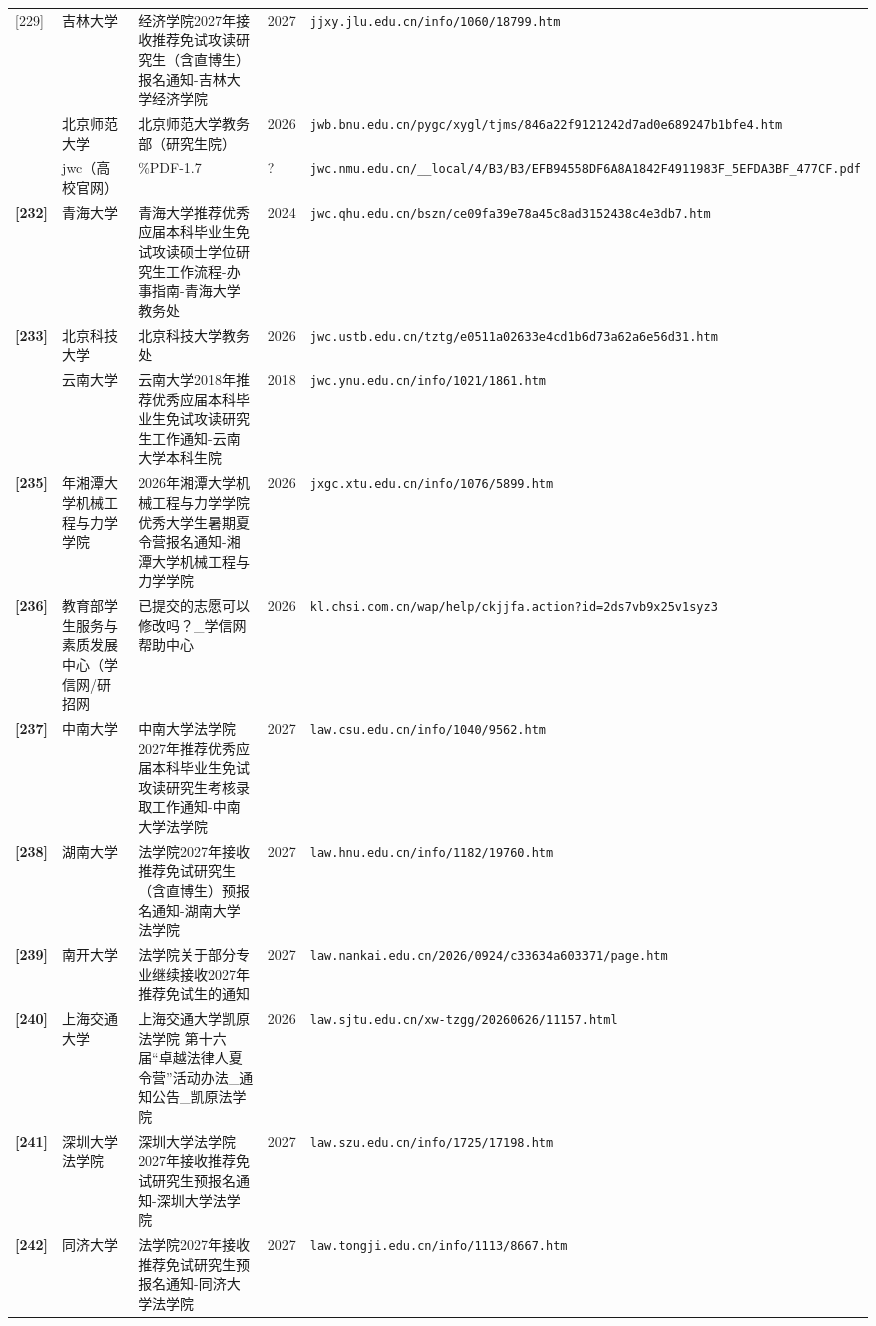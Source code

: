 {\begin{longtable}{@{}p{1.15cm}p{2.9cm}p{6.3cm}p{0.85cm}p{5.0cm}@{}}
[229] & 吉林大学 & 经济学院2027年接收推荐免试攻读研究生（含直博生）报名通知-吉林大学经济学院 & 2027 & \texttt{jjxy.jlu.edu.cn/info/1060/18799.htm} \\
[230] & 北京师范大学 & 北京师范大学教务部（研究生院） & 2026 & \texttt{jwb.bnu.edu.cn/pygc/xygl/tjms/846a22f9121242d7ad0e689247b1bfe4.htm} \\
[231] & jwc（高校官网） & \%PDF-1.7 & ? & \texttt{jwc.nmu.edu.cn/\_\_local/4/B3/B3/EFB94558DF6A8A1842F4911983F\_5EFDA3BF\_477CF.pdf} \\
\textbf{[232]} & 青海大学 & 青海大学推荐优秀应届本科毕业生免试攻读硕士学位研究生工作流程-办事指南-青海大学教务处 & 2024 & \texttt{jwc.qhu.edu.cn/bszn/ce09fa39e78a45c8ad3152438c4e3db7.htm} \\
\textbf{[233]} & 北京科技大学 & 北京科技大学教务处 & 2026 & \texttt{jwc.ustb.edu.cn/tztg/e0511a02633e4cd1b6d73a62a6e56d31.htm} \\
[234] & 云南大学 & 云南大学2018年推荐优秀应届本科毕业生免试攻读研究生工作通知-云南大学本科生院 & 2018 & \texttt{jwc.ynu.edu.cn/info/1021/1861.htm} \\
\textbf{[235]} & 年湘潭大学机械工程与力学学院 & 2026年湘潭大学机械工程与力学学院优秀大学生暑期夏令营报名通知-湘潭大学机械工程与力学学院 & 2026 & \texttt{jxgc.xtu.edu.cn/info/1076/5899.htm} \\
\textbf{[236]} & 教育部学生服务与素质发展中心（学信网/研招网 & 已提交的志愿可以修改吗？\_学信网帮助中心 & 2026 & \texttt{kl.chsi.com.cn/wap/help/ckjjfa.action?id=2ds7vb9x25v1syz3} \\
\textbf{[237]} & 中南大学 & 中南大学法学院2027年推荐优秀应届本科毕业生免试攻读研究生考核录取工作通知-中南大学法学院 & 2027 & \texttt{law.csu.edu.cn/info/1040/9562.htm} \\
\textbf{[238]} & 湖南大学 & 法学院2027年接收推荐免试研究生（含直博生）预报名通知-湖南大学法学院 & 2027 & \texttt{law.hnu.edu.cn/info/1182/19760.htm} \\
\textbf{[239]} & 南开大学 & 法学院关于部分专业继续接收2027年推荐免试生的通知 & 2027 & \texttt{law.nankai.edu.cn/2026/0924/c33634a603371/page.htm} \\
\textbf{[240]} & 上海交通大学 & 上海交通大学凯原法学院 第十六届“卓越法律人夏令营”活动办法\_通知公告\_凯原法学院 & 2026 & \texttt{law.sjtu.edu.cn/xw-tzgg/20260626/11157.html} \\
\textbf{[241]} & 深圳大学法学院 & 深圳大学法学院2027年接收推荐免试研究生预报名通知-深圳大学法学院 & 2027 & \texttt{law.szu.edu.cn/info/1725/17198.htm} \\
\textbf{[242]} & 同济大学 & 法学院2027年接收推荐免试研究生预报名通知-同济大学法学院 & 2027 & \texttt{law.tongji.edu.cn/info/1113/8667.htm} \\

\end{longtable}}
